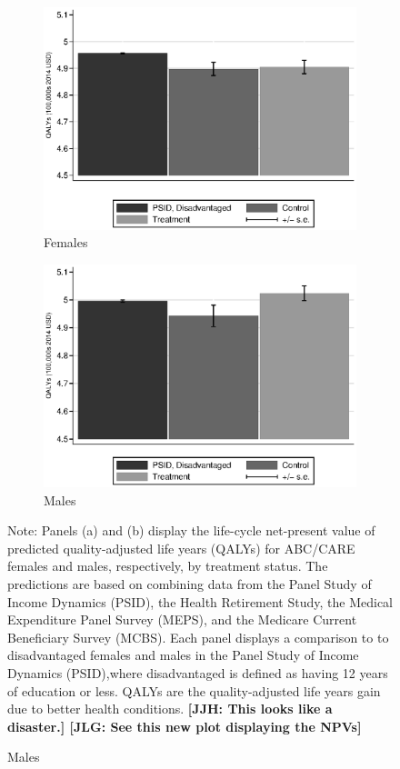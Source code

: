 \begin{figure}
\centering
\caption{Quality Adjusted Life Years, Predictions and Comparison to PSID}\label{fig:qalys}
\begin{subfigure}[h]{0.5\textwidth}
		\centering
		\caption{Females} \label{fig:qabcare1}
		\includegraphics[width=\textwidth]{output/qalyexppsid_0.eps}
\end{subfigure}%
\begin{subfigure}[h]{0.5\textwidth}
	\centering
	\caption{Males} \label{fig:qpsid1}
		\includegraphics[width=\textwidth]{output/qalyexppsid_1.eps}
\end{subfigure}
\footnotesize \justify
Note: Panels (a) and (b) display the life-cycle net-present value of predicted quality-adjusted life years (QALYs) for ABC/CARE females and males, respectively, by treatment status. The predictions are based on combining data from the Panel Study of Income Dynamics (PSID), the Health Retirement Study, the Medical Expenditure Panel Survey (MEPS), and the Medicare Current Beneficiary Survey (MCBS). Each panel displays a comparison to to disadvantaged females and males in the Panel Study of Income Dynamics (PSID),where disadvantaged is defined as having 12 years of education or less. QALYs are the quality-adjusted life years gain due to better health conditions. \textbf{[JJH: This looks like a disaster.] [JLG: See this new plot displaying the NPVs]}\\
\end{figure}

